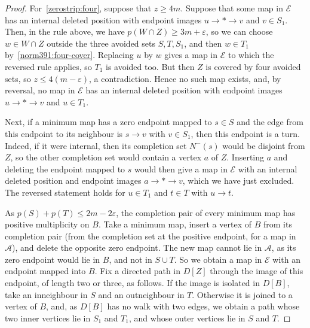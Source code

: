 \begin{proof}
For~\ref{zerostrip:four}, suppose that $z\ge4m$. Suppose that some map in $\mathcal E$ has an internal deleted position with endpoint images $u\to*\to v$ and $v\in S_1$. Then, in the rule above, we have $p(W\cap Z)\ge3m+\varepsilon$, so we can choose $w\in W\cap Z$ outside the three avoided sets $S,T,S_1$, and then $w\in T_1$ by~\eqref{norm391:four-cover}. Replacing $u$ by $w$ gives a map in $\mathcal E$ to which the reversed rule applies, so $T_1$ is avoided too. But then $Z$ is covered by four avoided sets, so $z\le4(m-\varepsilon)$, a contradiction. Hence no such map exists, and, by reversal, no map in $\mathcal E$ has an internal deleted position with endpoint images $u\to*\to v$ and $u\in T_1$.

Next, if a minimum map has a zero endpoint mapped to $s\in S$ and the edge from this endpoint to its neighbour is $s\to v$ with $v\in S_1$, then this endpoint is a turn. Indeed, if it were internal, then its completion set $N^-(s)$ would be disjoint from $Z$, so the other completion set would contain a vertex $a$ of $Z$. Inserting $a$ and deleting the endpoint mapped to $s$ would then give a map in $\mathcal E$ with an internal deleted position and endpoint images $a\to*\to v$, which we have just excluded. The reversed statement holds for $u\in T_1$ and $t\in T$ with $u\to t$.

As $p(S)+p(T)\le2m-2\varepsilon$, the completion pair of every minimum map has positive multiplicity on $B$. Take a minimum map, insert a vertex of $B$ from its completion pair (from the completion set at the positive endpoint, for a map in $\mathcal A$), and delete the opposite zero endpoint. The new map cannot lie in $\mathcal A$, as its zero endpoint would lie in $B$, and not in $S\cup T$. So we obtain a map in $\mathcal E$ with an endpoint mapped into $B$.
Fix a directed path in $D[Z]$ through the image of this endpoint, of length two or three, as follows. If the image is isolated in $D[B]$, take an inneighbour in $S$ and an outneighbour in $T$. Otherwise it is joined to a vertex of $B$, and, as $D[B]$ has no walk with two edges, we obtain a path whose two inner vertices lie in $S_1$ and $T_1$, and whose outer vertices lie in $S$ and $T$.


\end{proof}
